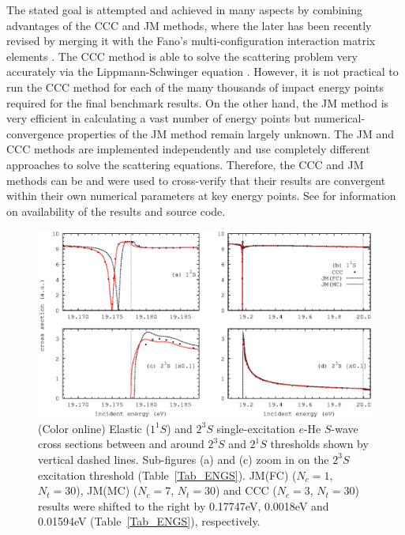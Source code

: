 \documentclass[aip
, pra
, showpacs
, aps
, twocolumn
, groupedaddress
, floatfix
]{revtex4}
\begin{document}
The stated goal is attempted and achieved in many aspects by combining advantages of the CCC and JM methods,
where the later has been recently revised \cite{KFB11} by merging it with the Fano's multi-configuration interaction matrix elements \cite{Fano65}.
The CCC method is able to solve the scattering problem very accurately via the Lippmann-Schwinger equation \cite{BS92p6995}.
However, it is not practical to run the CCC method for each of the many thousands of impact energy points required for the final benchmark results.
On the other hand, the JM method is very efficient \cite{HY74p1201,BR76p1491} in calculating a vast number of energy points
but numerical-convergence properties of the JM method remain largely unknown.
The JM and CCC methods are implemented independently and use completely different approaches to solve the scattering equations.
Therefore, the CCC and JM methods can be and were used to cross-verify that their results are convergent within their own numerical parameters at key energy points.
See \cite{JMatrixWebsite} for information on availability of the results and source code.


\begin{figure}[htb]
\includegraphics[scale=1]{fig1.ps}
\caption{(Color online) Elastic ($1^1S$) and
$2^3S$ single-excitation $e$-He $S$-wave cross sections between and around $2^3S$ and $2^1S$ thresholds shown by vertical dashed lines.
Sub-figures (a) and (c) zoom in on the $2^3S$ excitation threshold (Table~\ref{Tab_ENGS}).
JM(FC) ($N_c=1$, $N_t=30$), JM(MC) ($N_c=7$, $N_t=30$) and CCC ($N_c=3$, $N_t=30$) results  were shifted to the right by 0.17747eV, 0.0018eV
and 0.01594eV (Table~\ref{Tab_ENGS}), respectively.
}
\label{Fig_1}
\end{figure}
\end{document}
